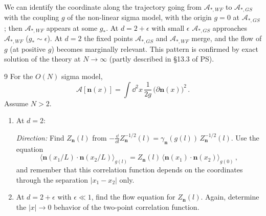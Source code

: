 We can identify the coordinate along the trajectory going from
$\mathcal A_{*,WF}$ to $\mathcal A_{*,GS}$ with the coupling $g$ of the
non-linear sigma model, with the origin $g=0$ at $\mathcal A_{*,GS}$; then
$\mathcal A_{*,WF}$ appears at some $g_*$. At $d=2+\epsilon$ with small $\epsilon$
$\mathcal A_{*,GS}$ approaches $\mathcal A_{*,WF}$ ($g_*\sim\epsilon$). At $d=2$ the
fixed points $\mathcal A_{*,GS}$ and $\mathcal A_{*,WF}$ merge, and the flow of $g$
(at positive $g$) becomes marginally relevant. This pattern is confirmed by exact
solution of the theory at $N\to\infty$ (partly described in \S13.3 of PS).

\begin{hwproblem}{9}\label{hw:9}
For the $O(N)$ sigma model,
\[
\mathcal A[\mathbf n(x)]=\int \dd^2x\,\frac1{2g}\,\bigl(\partial\mathbf n(x)\bigr)^2\,.
\]
Assume $N>2$.
\begin{enumerate}[label=\Roman*.,leftmargin=*]
\item At $d=2$:
\emph{Direction:} Find $Z_{\mathbf n}(l)$ from
$-\frac{\dd}{\dd l}Z_{\mathbf n}^{-1/2}(l)=\gamma_{\mathbf n}(g(l))\,Z_{\mathbf n}^{-1/2}(l)$.
Use the equation
\[
\bigl\langle\mathbf n(x_1/L)\cdot\mathbf n(x_2/L)\bigr\rangle_{g(l)}=Z_{\mathbf n}(l)\,\bigl\langle\mathbf n(x_1)\cdot\mathbf n(x_2)\bigr\rangle_{g(0)}\,,
\]
and remember that this correlation function depends on the coordinates through the
separation $|x_1-x_2|$ only.

\item At $d=2+\epsilon$ with $\epsilon\ll1$, find the flow equation for
$Z_{\mathbf n}(l)$. Again, determine the $|x|\to0$ behavior of the two-point
correlation function.
\end{enumerate}
\end{hwproblem}
